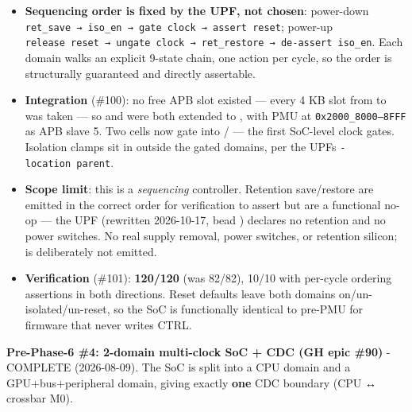 \begin{record}
\begin{itemize}
\tightlist
\item
  \textbf{Sequencing order is fixed by the UPF, not chosen}: power-down
  \texttt{ret\_\allowbreak{}save\ →\ iso\_\allowbreak{}en\ →\ gate\ clock\ →\ assert\ reset};
  power-up
  \texttt{release\ reset\ →\ ungate\ clock\ →\ ret\_\allowbreak{}restore\ →\ de-\allowbreak{}assert\ iso\_\allowbreak{}en}.
  Each domain walks an explicit 9-state chain, one action per cycle, so
  the order is structurally guaranteed and directly assertable.
\item
  \textbf{Integration} (\#100): no free APB slot existed --- every 4 KB
  slot from  to  was taken --- so
   and  were both extended to
  , with PMU at
  \texttt{0x2000\_\allowbreak{}8000–8FFF} as APB slave 5. Two
   cells now gate  into
  / --- the first SoC-level clock gates.
  Isolation clamps sit in  outside the gated domains, per
  the UPF\textquotesingle s \texttt{-\allowbreak{}location\ parent}.
\item
  \textbf{Scope limit}: this is a \emph{sequencing} controller.
  Retention save/\allowbreak{}restore are emitted in the correct order
  for verification to assert but are a functional no-op --- the UPF
  (rewritten 2026-10-17, bead ) declares no retention and no
  power switches. No real supply removal, power switches, or retention
  silicon;  is deliberately not emitted.
\item
  \textbf{Verification} (\#101):  \textbf{120/120} (was
  82/82),  10/10 with per-cycle ordering assertions in
  both directions. Reset defaults leave both domains
  on/\allowbreak{}un-isolated/\allowbreak{}un-reset, so the SoC is
  functionally identical to pre-PMU for firmware that never writes CTRL.
\end{itemize}

\textbf{Pre-Phase-6 \#4: 2-domain multi-clock SoC + CDC (GH epic \#90)}
- \ok{} COMPLETE (2026-08-09). The SoC is split into a CPU domain and a
GPU+bus+peripheral domain, giving exactly \textbf{one} CDC boundary (CPU
↔ crossbar M0).


\end{record}
